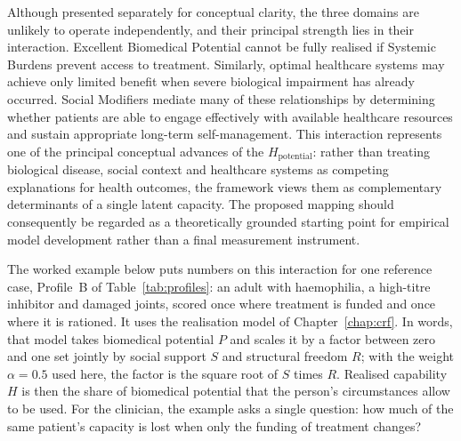 Although presented separately for conceptual clarity, the three domains are unlikely to operate independently, and their principal strength lies in their interaction. Excellent Biomedical Potential cannot be fully realised if Systemic Burdens prevent access to treatment. Similarly, optimal healthcare systems may achieve only limited benefit when severe biological impairment has already occurred. Social Modifiers mediate many of these relationships by determining whether patients are able to engage effectively with available healthcare resources and sustain appropriate long-term self-management. This interaction represents one of the principal conceptual advances of the $H_{\text{potential}}$: rather than treating biological disease, social context and healthcare systems as competing explanations for health outcomes, the framework views them as complementary determinants of a single latent capacity. The proposed mapping should consequently be regarded as a theoretically grounded starting point for empirical model development rather than a final measurement instrument.

The worked example below puts numbers on this interaction for one reference case, Profile~B of Table~\ref{tab:profiles}: an adult with haemophilia, a high-titre inhibitor and damaged joints, scored once where treatment is funded and once where it is rationed. It uses the realisation model of Chapter~\ref{chap:crf}. In words, that model takes biomedical potential $P$ and scales it by a factor between zero and one set jointly by social support $S$ and structural freedom $R$; with the weight $\alpha=0.5$ used here, the factor is the square root of $S$ times $R$. Realised capability $H$ is then the share of biomedical potential that the person's circumstances allow to be used. For the clinician, the example asks a single question: how much of the same patient's capacity is lost when only the funding of treatment changes?

